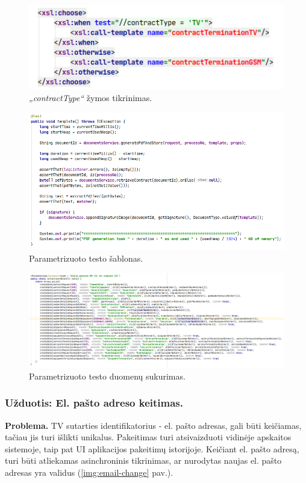 \begin{figure}[H]
    \centering
    \includegraphics[scale=0.5]{img/contractType.png}
    \caption{\textit{„contractType“} žymos tikrinimas.}
    \label{img:contractType}
\end{figure}

\begin{figure}[H]
    \centering
    \includegraphics[scale=0.5]{img/template.png}
    \caption{Parametrizuoto testo šablonas.}
    \label{img:template}
\end{figure}

\begin{figure}[H]
    \centering
    \includegraphics[scale=0.3]{img/param-tests.png}
    \caption{Parametrizuoto testo duomenų sukurimas.}
    \label{img:param-tests}
\end{figure}


\subsubsection{Užduotis: El. pašto adreso keitimas.}
\textbf{Problema.} TV sutarties identifikatorius - el. pašto adresas, gali būti keičiamas, tačiau jis turi išlikti unikalus.
Pakeitimas turi atsivaizduoti vidinėje apskaitos sistemoje, taip pat UI aplikacijos pakeitimų istorijoje. Keičiant el. pašto adresą, turi būti
atliekamas asinchroninis tikrinimas, ar nurodytas naujas el. pašto adresas yra validus (\ref{img:email-change} pav.).


